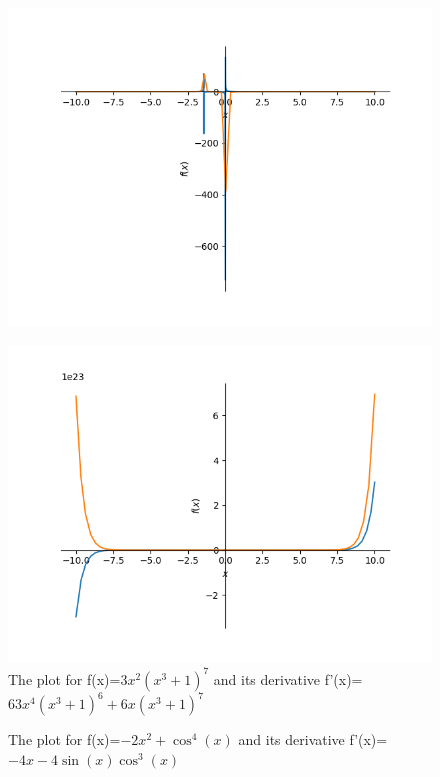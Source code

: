 \documentclass{article}
\begin{document}
\begin{figure}
\includegraphics{plot_3}
\end{figure}\begin{figure}
\caption{The plot for f(x)=$3 x^{2} \left(x^{3} + 1\right)^{7}$ and its derivative f'(x)=$63 x^{4} \left(x^{3} + 1\right)^{6} + 6 x \left(x^{3} + 1\right)^{7}$}
\centering
\includegraphics{plot_4}
\end{figure}\begin{figure}
\caption{The plot for f(x)=$- 2 x^{2} + \cos^{4}{\left(x \right)}$ and its derivative f'(x)=$- 4 x - 4 \sin{\left(x \right)} \cos^{3}{\left(x \right)}$}
\centering

\end{figure}
\end{document}
